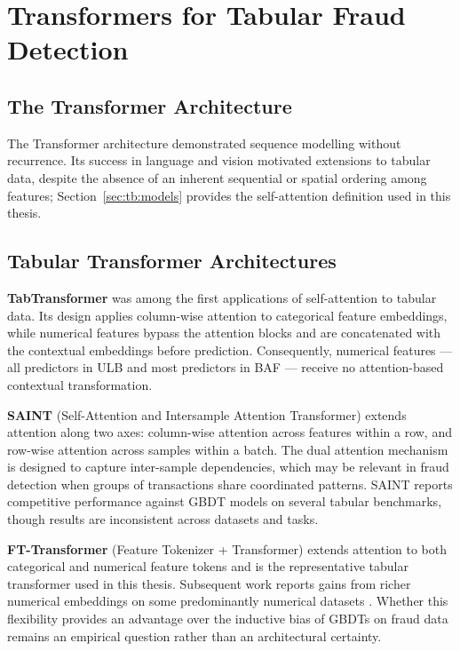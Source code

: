 \section{Transformers for Tabular Fraud Detection}
\label{subsec:transformers_tabular}

\subsection{The Transformer Architecture}
\label{subsec:sota-transformer-arch}

The Transformer architecture \cite{vaswani2017attention} demonstrated sequence modelling without recurrence. Its success in language and vision motivated extensions to tabular data, despite the absence of an inherent sequential or spatial ordering among features; Section~\ref{sec:tb:models} provides the self-attention definition used in this thesis.

\subsection{Tabular Transformer Architectures}
\label{subsec:sota-tabular-transformers}

\textbf{TabTransformer} \cite{huang2020tabtransformer} was among the first applications of self-attention to tabular data. Its design applies column-wise attention to categorical feature embeddings, while numerical features bypass the attention blocks and are concatenated with the contextual embeddings before prediction. Consequently, numerical features — all predictors in ULB and most predictors in BAF — receive no attention-based contextual transformation.

\textbf{SAINT} (Self-Attention and Intersample Attention Transformer) \cite{somepalli2021saint} extends attention along two axes: column-wise attention across features within a row, and row-wise attention across samples within a batch. The dual attention mechanism is designed to capture inter-sample dependencies, which may be relevant in fraud detection when groups of transactions share coordinated patterns. SAINT reports competitive performance against GBDT models on several tabular benchmarks, though results are inconsistent across datasets and tasks.

\textbf{FT-Transformer} (Feature Tokenizer + Transformer) \cite{gorishniy2021revisiting} extends attention to both categorical and numerical feature tokens and is the representative tabular transformer used in this thesis. Subsequent work reports gains from richer numerical embeddings on some predominantly numerical datasets \cite{gorishniy2022embeddings}. Whether this flexibility provides an advantage over the inductive bias of GBDTs on fraud data remains an empirical question rather than an architectural certainty.

